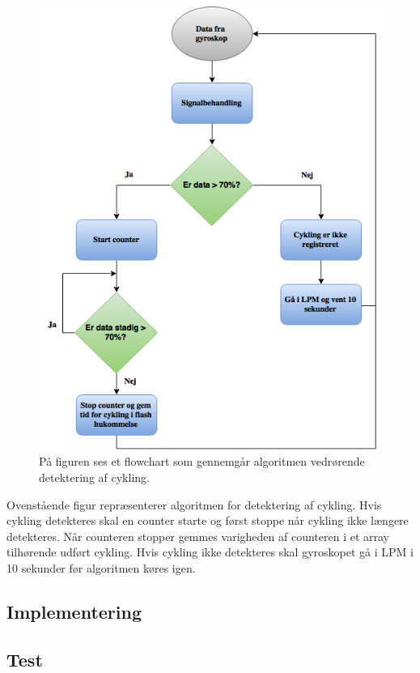 \begin{figure}[H]
	\centering
	\includegraphics[scale=0.6]{figures/cDesign/algoritme_cykling.png}
	\caption{På figuren ses et flowchart som gennemgår algoritmen vedrørende detektering af cykling.}
	\label{fig:algoritme_cykling}
\end{figure}

Ovenstående figur repræsenterer algoritmen for detektering af cykling. Hvis cykling detekteres skal en counter starte og først stoppe når cykling ikke længere detekteres. Når counteren stopper gemmes varigheden af counteren i et array tilhørende udført cykling. Hvis cykling ikke detekteres skal gyroskopet gå i LPM i 10 sekunder før algoritmen køres igen. 


\subsection{Implementering}




\subsection{Test}

